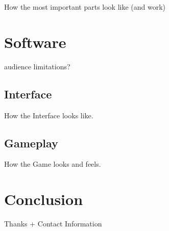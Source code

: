 How the most important parts look like (and work)

\chapter{Software}

audience limitations?

\section{Interface}

How the Interface looks like.

\section{Gameplay}

How the Game looks and feels.

\chapter{Conclusion}

Thanks + Contact Information


